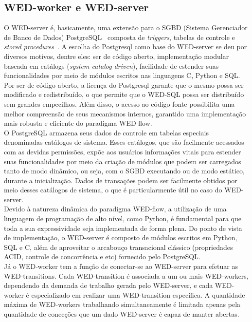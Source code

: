 \documentclass[conference]{IEEEtran}
\begin{document}
\subsection{WED-worker e WED-server}
O WED-server é, basicamente, uma extensão para o SGBD (Sistema Gerenciador de Banco de Dados) PostgreSQL~\cite{PSQL} composta de 
\emph{triggers}, tabelas de controle e \emph{stored procedures}~\cite{NAV}. A escolha do Postgresql como base do WED-server 
se deu por diversos motivos, dentre eles: ser de código aberto, implementação modular baseada em catálogs (\emph{system catalog driven}), 
facilidade de estender suas funcionalidades por meio de módulos escritos nas linguagens C, Python e SQL.
\\
\indent Por ser de código aberto, a licença do Postgresql garante que o mesmo possa ser modificado e redistribuído, o que permite
que o WED-SQL possa ser distribuído sem grandes empecilhos. Além disso, o acesso ao código fonte possibilita uma melhor compreensão
de seus mecanismos internos, garantido uma implementação mais robusta e eficiente do paradigma WED-flow. 
\\
\indent O PostgreSQL armazena seus dados de controle em tabelas especiais denominadas catálogos de sistema. Esses catálogos, 
que são facilmente acessados com as devidas permissões, expõe aos usuários informações vitais para estender suas funcionalidades
por meio da criação de módulos que podem ser carregados tanto de modo dinâmico, ou seja, com o SGBD executando ou de modo
estático, durante a inicialização. Dados de transações podem ser facilmente obtidos por meio desses 
catálogos de sistema, o que é particularmente útil no caso do WED-server. 
\\
\indent Devido à natureza dinâmica do paradigma WED-flow, a utilização de uma linguagem de programação de alto nível, como Python, 
é fundamental para que toda a sua expressividade seja implementada de forma plena. Do ponto de vista de implementação, 
o WED-server é composto de módulos escritos em Python, SQL e C, além de aproveitar o arcabouço transacional clássico (propriedades ACID, controle de concorrência e etc) fornecido pelo PostgreSQL.
\\
\indent Já o WED-worker tem a função de conectar-se ao WED-server para efetuar as WED-transitions. Cada WED-transition é 
associada a um ou mais WED-workers, dependendo da demanda de trabalho gerada pelo WED-server, e cada WED-worker é especializado
em realizar uma WED-transition específica. A quantidade máxima de WED-workers trabalhando simultaneamente é limitada
apenas pela quantidade de conecções que um dado WED-server é capaz de manter abertas.
\end{document}
